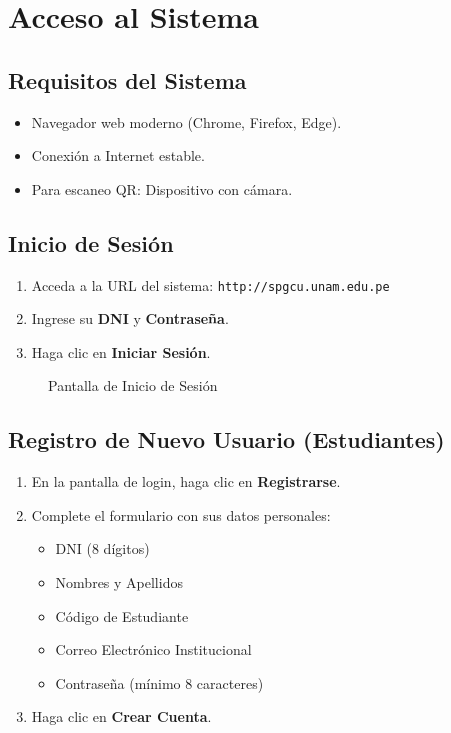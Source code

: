 \documentclass[12pt,a4paper]{article}
\begin{document}
\section{Acceso al Sistema}

\subsection{Requisitos del Sistema}
\begin{itemize}
    \item Navegador web moderno (Chrome, Firefox, Edge).
    \item Conexión a Internet estable.
    \item Para escaneo QR: Dispositivo con cámara.
\end{itemize}

\subsection{Inicio de Sesión}
\begin{enumerate}
    \item Acceda a la URL del sistema: \texttt{http://spgcu.unam.edu.pe}
    \item Ingrese su \textbf{DNI} y \textbf{Contraseña}.
    \item Haga clic en \textbf{Iniciar Sesión}.
\end{enumerate}

\begin{figure}[h]
    \centering
    \caption{Pantalla de Inicio de Sesión}
    \label{fig:login}
\end{figure}

\subsection{Registro de Nuevo Usuario (Estudiantes)}
\begin{enumerate}
    \item En la pantalla de login, haga clic en \textbf{Registrarse}.
    \item Complete el formulario con sus datos personales:
    \begin{itemize}
        \item DNI (8 dígitos)
        \item Nombres y Apellidos
        \item Código de Estudiante
        \item Correo Electrónico Institucional
        \item Contraseña (mínimo 8 caracteres)
    \end{itemize}
    \item Haga clic en \textbf{Crear Cuenta}.
\end{enumerate}
\end{document}
